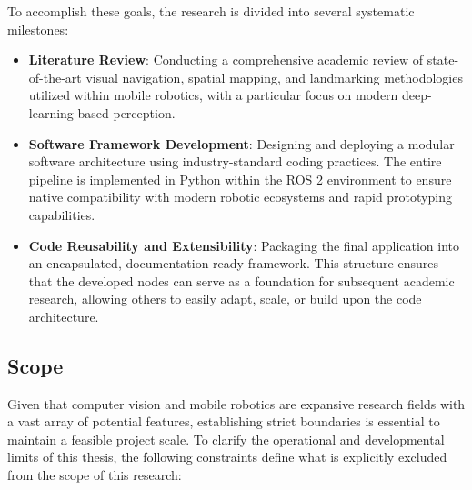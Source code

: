 To accomplish these goals, the research is divided into several systematic milestones:
\begin{itemize}
	\item \textbf{Literature Review}: Conducting a comprehensive academic review of state-of-the-art visual navigation, spatial mapping, and landmarking methodologies utilized within mobile robotics, with a particular focus on modern deep-learning-based perception.
	\item \textbf{Software Framework Development}: Designing and deploying a modular software architecture using industry-standard coding practices. The entire pipeline is implemented in Python within the ROS 2 environment to ensure native compatibility with modern robotic ecosystems and rapid prototyping capabilities.
	\item \textbf{Code Reusability and Extensibility}: Packaging the final application into an encapsulated, documentation-ready framework. This structure ensures that the developed nodes can serve as a foundation for subsequent academic research, allowing others to easily adapt, scale, or build upon the code architecture.
\end{itemize}
 

\subsection{Scope} %
Given that computer vision and mobile robotics are expansive research fields with a vast array of potential features, establishing strict boundaries is essential to maintain a feasible project scale. To clarify the operational and developmental limits of this thesis, the following constraints define what is explicitly excluded from the scope of this research:

